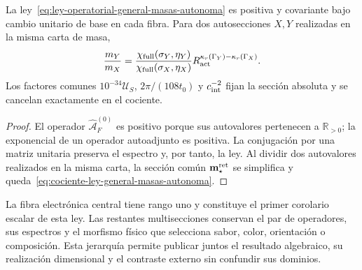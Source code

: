 \begin{theorem}
\label{thm:covariancia-ley-general-masas-autonoma}
La ley~\eqref{eq:ley-operatorial-general-masas-autonoma} es positiva y
covariante bajo cambio unitario de base en cada fibra. Para dos autosecciones
\(X,Y\) realizadas en la misma carta de masa,
\begin{equation}
 \frac{m_Y}{m_X}
 =\frac{\chi_{\rm full}(\sigma_Y,\eta_Y)}
        {\chi_{\rm full}(\sigma_X,\eta_X)}
  R_{\rm act}^{\kappa_r(\Gamma_Y)-\kappa_r(\Gamma_X)}.
 \label{eq:cociente-ley-general-masas-autonoma}
\end{equation}
Los factores comunes \(10^{-34}\mathcal U_S\), \(2\pi/(108t_0)\) y
\(c_{\rm int}^{-2}\) fijan la sección absoluta y se cancelan exactamente en
el cociente.
\end{theorem}

\begin{proof}
El operador \(\widehat{\mathcal A}^{(0)}_F\) es positivo porque sus
autovalores pertenecen a \(\mathbb R_{>0}\); la exponencial de un operador
autoadjunto es positiva. La conjugación por una matriz unitaria preserva el
espectro y, por tanto, la ley. Al dividir dos autovalores realizados en la
misma carta, la sección común \(\mathbf m_\star^{\rm ret}\) se simplifica y
queda~\eqref{eq:cociente-ley-general-masas-autonoma}.
\end{proof}

La fibra electrónica central tiene rango uno y constituye el primer
corolario escalar de esta ley. Las restantes multisecciones conservan el par
de operadores, sus espectros y el morfismo físico que selecciona sabor,
color, orientación o composición. Esta jerarquía permite publicar juntos el
resultado algebraico, su realización dimensional y el contraste externo sin
confundir sus dominios.
